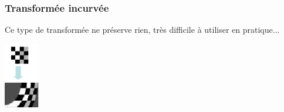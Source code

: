 \documentclass[letterpaper, 12pt]{article}
\newcommand{\alinea}{
\hspace*{0.5cm}}
\begin{document}
		\subsubsection{Transformée incurvée}
			\begin{minipage}{0.75\textwidth}
				\alinea Ce type de transformée ne préserve rien, très difficile à utiliser en pratique...
			\end{minipage} \hfill
			\begin{minipage}{0.24\textwidth}
				\begin{center}
					\includegraphics[width=0.6in]{Images/curved}
				\end{center}
			\end{minipage}
\end{document}
